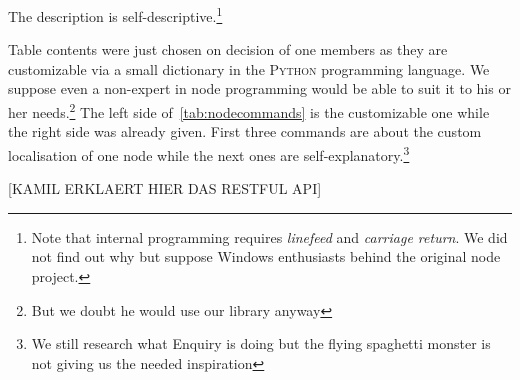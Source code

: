 The description is self-descriptive.\footnote{Note that internal programming requires \textit{linefeed} and \textit{carriage return}. We did not find out 
why but suppose Windows enthusiasts behind the original node project.}

Table contents were just chosen on decision of one members as they are customizable via a small dictionary in the \textsc{Python} programming language. We 
suppose even a non-expert in node programming would be able to suit it to his or her needs.\footnote{But we doubt he would use our library anyway}
The left side of~\ref{tab:nodecommands} is the customizable one while the right side was already given. First three commands are about the 
custom localisation of one node while the next ones are self-explanatory.\footnote{We still research what Enquiry is doing but the flying spaghetti monster is not giving us the needed inspiration}

[KAMIL ERKLAERT HIER DAS RESTFUL API]
